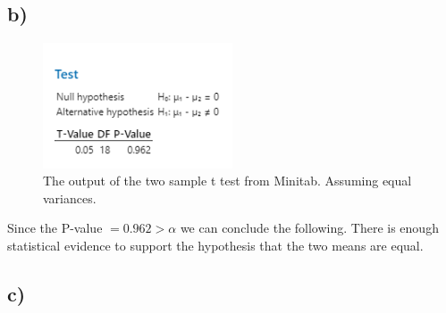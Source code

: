 \documentclass{article}
\begin{document}
\subsection*{b)}
\begin{figure}[h]
    \centering
    \includegraphics[width=0.5\textwidth]{./images/3_b.png}
    \caption{The output of the two sample t test from Minitab. Assuming equal variances.}
    \label{fig:3_a}
  \end{figure}
  Since the P-value $= 0.962 > \alpha$ we can conclude the following.
  There is enough statistical evidence to support the hypothesis that the two means are equal.
\subsection*{c)}
\end{document}
